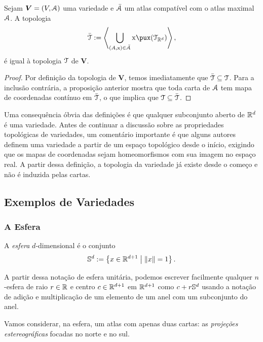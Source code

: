 \begin{prop}
Sejam $\bm V=(V,\atlas)$ uma variedade e $\bar\atlas$ um atlas compatível com o atlas maximal $\atlas$. A topologia
	\begin{equation*}
	\bar\topo := \ger{\bigcup_{(A,\x) \in \bar\atlas} \x\pux(\topo_{\R^d})},
	\end{equation*}
é igual à topologia $\topo$ de $\bm V$.
\end{prop}
\begin{proof}
Por definição da topologia de $\bm V$, temos imediatamente que $\bar\topo \subseteq \topo$. Para a inclusão contrária, a proposição anterior mostra que toda carta de $\atlas$ tem mapa de coordenadas contínuo em $\bar\topo$, o que implica que $\topo \subseteq \bar\topo$.
\end{proof}

Uma consequência óbvia das definições é que qualquer subconjunto aberto de $\R^d$ é uma variedade. Antes de continuar a discussão sobre as propriedades topológicas de variedades, um comentário importante é que alguns autores definem uma variedade a partir de um espaço topológico desde o início, exigindo que os mapas de coordenadas sejam homeomorfismos com sua imagem no espaço real. A partir dessa definição, a topologia da variedade já existe desde o começo e não é induzida pelas cartas.

\subsection{Exemplos de Variedades}

\subsubsection{A Esfera}

\begin{defi}
A \emph{esfera} $d$-dimensional é o conjunto
	\begin{equation*}
	\S^d := \set{x \in \R^{d+1}}{\nor{x}=1}.
	\end{equation*}
\end{defi}

A partir dessa notação de esfera unitária, podemos escrever facilmente qualquer $n$-esfera de raio $r \in \R$ e centro $c \in \R^{d+1}$ em $\R^{d+1}$ como $c + r\S^d$ usando a notação de adição e multiplicação de um elemento de um anel com um subconjunto do anel.

Vamos considerar, na esfera, um atlas com apenas duas cartas: as \emph{projeções estereográficas} focadas no norte e no sul.

